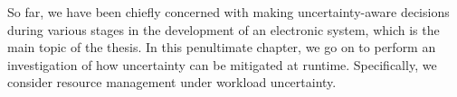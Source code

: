 So far, we have been chiefly concerned with making uncertainty-aware decisions
during various stages in the development of an electronic system, which is the
main topic of the thesis. In this penultimate chapter, we go on to perform an
investigation of how uncertainty can be mitigated at runtime. Specifically, we
consider resource management under workload uncertainty.

\section{\introductiontitle}

\section{\problemtitle}

\section{\pasttitle}

\section{\solutiontitle}

\section{\resultstitle}

\section{\conclusiontitle}

